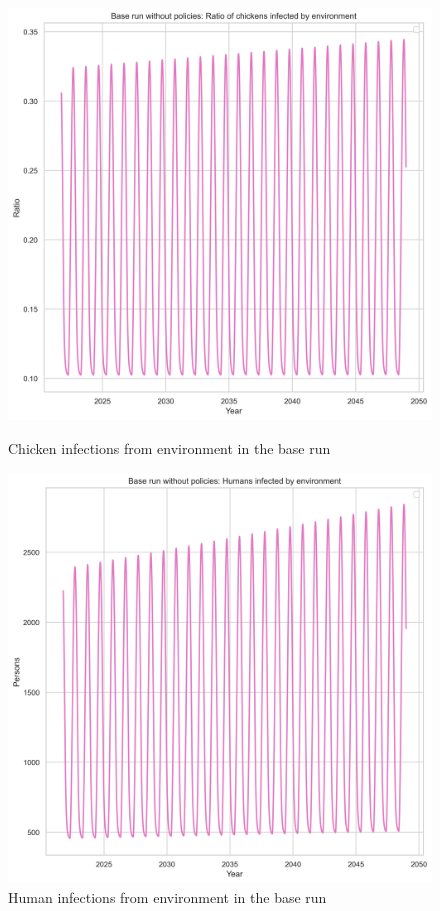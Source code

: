 \begin{figure}[h!]
    \centering
    \begin{minipage}{0.45\textwidth}
        \centering
        \includegraphics[width=1\textwidth]{images/br_chickeninfection.png} 
        \caption{Chicken infections from environment in the base run}
        \label{fig:b_chicken}
    \end{minipage}\hfill
    \begin{minipage}{0.45\textwidth}
        \centering
        \includegraphics[width=1\textwidth]{images/br_humaninfection.png}
        \caption{Human infections from environment in the base run}
        \label{fig:b_human}
    \end{minipage}
\end{figure}

